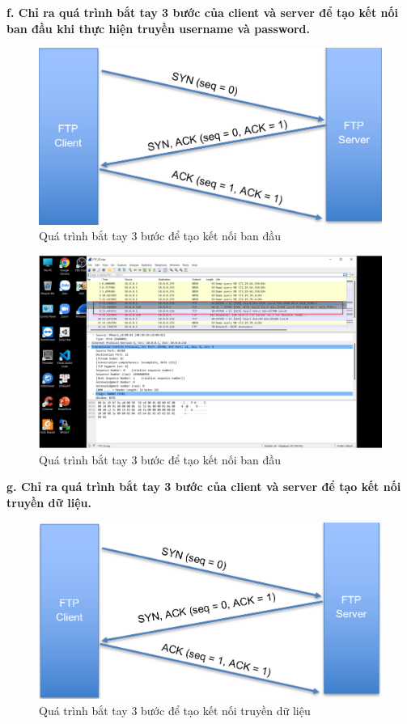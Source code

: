 \textbf{f.	Chỉ ra quá trình bắt tay 3 bước của client và server để tạo kết nối ban đầu khi thực hiện truyền username và password.}
\begin{figure}[H]
\begin{center}
\includegraphics[scale=.6]{../figures/p5/p5_4}
\end{center}
\caption{Quá trình bắt tay 3 bước để tạo kết nối ban đầu}
\end{figure}

\begin{figure}[H]
\begin{center}
\includegraphics[scale=.8]{../figures/p5/p5_5}
\end{center}
\caption{Quá trình bắt tay 3 bước để tạo kết nối ban đầu}
\end{figure}

\textbf{g.	Chỉ ra quá trình bắt tay 3 bước của client và server để tạo kết nối truyền dữ liệu.}
\begin{figure}[H]
\begin{center}
\includegraphics[scale=.6]{../figures/p5/p5_6}
\end{center}
\caption{Quá trình bắt tay 3 bước để tạo kết nối truyền dữ liệu}
\end{figure}

